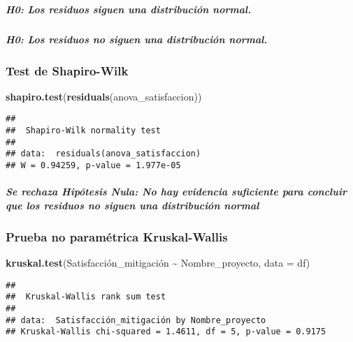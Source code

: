 \documentclass[
]{article}
\newenvironment{Shaded}{\begin{snugshade}}{\end{snugshade}}
\newcommand{\AttributeTok}[1]{\textcolor[rgb]{0.13,0.29,0.53}{#1}}
\newcommand{\FunctionTok}[1]{\textcolor[rgb]{0.13,0.29,0.53}{\textbf{#1}}}
\newcommand{\NormalTok}[1]{#1}
\newcommand{\SpecialCharTok}[1]{\textcolor[rgb]{0.81,0.36,0.00}{\textbf{#1}}}
\begin{document}
\subparagraph{H0: Los residuos siguen una distribución
normal.}\label{h0-los-residuos-siguen-una-distribuciuxf3n-normal.}

\subparagraph{H0: Los residuos no siguen una distribución
normal.}\label{h0-los-residuos-no-siguen-una-distribuciuxf3n-normal.}

\subsubsection{\texorpdfstring{\textbf{Test de
Shapiro-Wilk}}{Test de Shapiro-Wilk}}\label{test-de-shapiro-wilk}

\begin{Shaded}
\begin{Highlighting}[]
\FunctionTok{shapiro.test}\NormalTok{(}\FunctionTok{residuals}\NormalTok{(anova\_satisfaccion))}
\end{Highlighting}
\end{Shaded}

\begin{verbatim}
## 
##  Shapiro-Wilk normality test
## 
## data:  residuals(anova_satisfaccion)
## W = 0.94259, p-value = 1.977e-05
\end{verbatim}

\subparagraph{\texorpdfstring{\emph{Se rechaza Hipótesis Nula: No hay
evidencia suficiente para concluir que los residuos no siguen una
distribución
normal}}{Se rechaza Hipótesis Nula: No hay evidencia suficiente para concluir que los residuos no siguen una distribución normal}}\label{se-rechaza-hipuxf3tesis-nula-no-hay-evidencia-suficiente-para-concluir-que-los-residuos-no-siguen-una-distribuciuxf3n-normal}

\subsubsection{\texorpdfstring{\textbf{Prueba no paramétrica
Kruskal-Wallis}}{Prueba no paramétrica Kruskal-Wallis}}\label{prueba-no-paramuxe9trica-kruskal-wallis}

\begin{Shaded}
\begin{Highlighting}[]
\FunctionTok{kruskal.test}\NormalTok{(Satisfacción\_mitigación }\SpecialCharTok{\textasciitilde{}}\NormalTok{ Nombre\_proyecto, }\AttributeTok{data =}\NormalTok{ df)}
\end{Highlighting}
\end{Shaded}

\begin{verbatim}
## 
##  Kruskal-Wallis rank sum test
## 
## data:  Satisfacción_mitigación by Nombre_proyecto
## Kruskal-Wallis chi-squared = 1.4611, df = 5, p-value = 0.9175
\end{verbatim}
\end{document}
